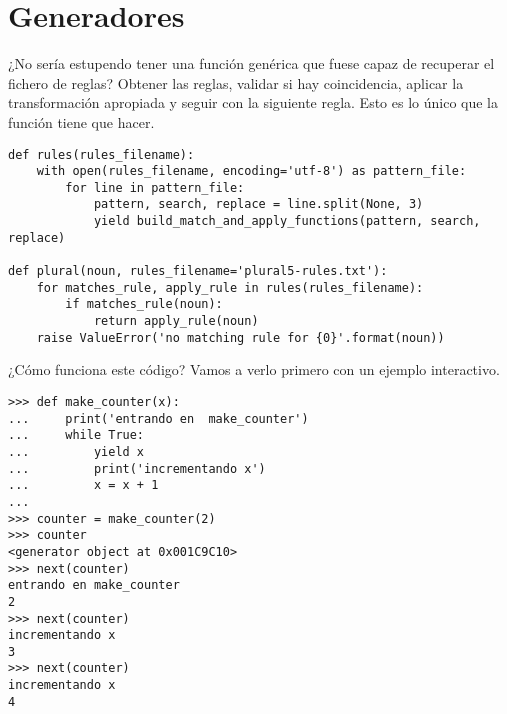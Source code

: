 \section{Generadores}

¿No sería estupendo tener una función genérica que fuese capaz de recuperar el fichero de reglas? Obtener las reglas, validar si hay coincidencia, aplicar la transformación apropiada y seguir con la siguiente regla. Esto es lo único que la función  tiene que hacer.

\noindent\begin{minipage}{\textwidth}
\begin{lstlisting}[mathescape=True]
def rules(rules_filename):
    with open(rules_filename, encoding='utf-8') as pattern_file:
        for line in pattern_file:
            pattern, search, replace = line.split(None, 3)
            yield build_match_and_apply_functions(pattern, search, replace)

def plural(noun, rules_filename='plural5-rules.txt'):
    for matches_rule, apply_rule in rules(rules_filename):
        if matches_rule(noun):
            return apply_rule(noun)
    raise ValueError('no matching rule for {0}'.format(noun))
\end{lstlisting}
\end{minipage}

¿Cómo funciona este código? Vamos a verlo primero con un ejemplo interactivo.

\noindent\begin{minipage}{\textwidth}
\begin{lstlisting}[mathescape=True]
>>> def make_counter(x):
...     print('entrando en  make_counter')
...     while True:
...         yield x
...         print('incrementando x')
...         x = x + 1
... 
>>> counter = make_counter(2)
>>> counter
<generator object at 0x001C9C10>
>>> next(counter)
entrando en make_counter
2
>>> next(counter)
incrementando x
3
>>> next(counter)
incrementando x
4
\end{lstlisting}
\end{minipage}

